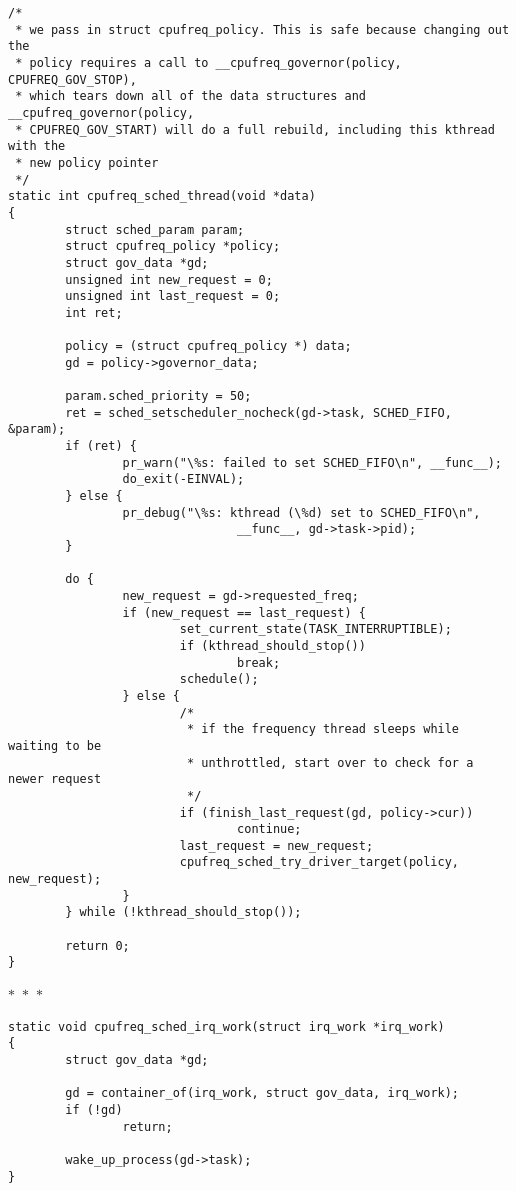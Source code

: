 \documentclass{article}
\newcommand{\divider}{{\begin{center}
  $\ast$~$\ast$~$\ast$
\end{center}}}
\begin{document}
\begin{verbatim}
/*
 * we pass in struct cpufreq_policy. This is safe because changing out the
 * policy requires a call to __cpufreq_governor(policy, CPUFREQ_GOV_STOP),
 * which tears down all of the data structures and __cpufreq_governor(policy,
 * CPUFREQ_GOV_START) will do a full rebuild, including this kthread with the
 * new policy pointer
 */
static int cpufreq_sched_thread(void *data)
{
        struct sched_param param;
        struct cpufreq_policy *policy;
        struct gov_data *gd;
        unsigned int new_request = 0;
        unsigned int last_request = 0;
        int ret;

        policy = (struct cpufreq_policy *) data;
        gd = policy->governor_data;

        param.sched_priority = 50;
        ret = sched_setscheduler_nocheck(gd->task, SCHED_FIFO, &param);
        if (ret) {
                pr_warn("\%s: failed to set SCHED_FIFO\n", __func__);
                do_exit(-EINVAL);
        } else {
                pr_debug("\%s: kthread (\%d) set to SCHED_FIFO\n",
                                __func__, gd->task->pid);
        }

        do {
                new_request = gd->requested_freq;
                if (new_request == last_request) {
                        set_current_state(TASK_INTERRUPTIBLE);
                        if (kthread_should_stop())
                                break;
                        schedule();
                } else {
                        /*
                         * if the frequency thread sleeps while waiting to be
                         * unthrottled, start over to check for a newer request
                         */
                        if (finish_last_request(gd, policy->cur))
                                continue;
                        last_request = new_request;
                        cpufreq_sched_try_driver_target(policy, new_request);
                }
        } while (!kthread_should_stop());

        return 0;
}
\end{verbatim}
\divider
\begin{verbatim}
static void cpufreq_sched_irq_work(struct irq_work *irq_work)
{
        struct gov_data *gd;

        gd = container_of(irq_work, struct gov_data, irq_work);
        if (!gd)
                return;

        wake_up_process(gd->task);
}
\end{verbatim}
\end{document}
